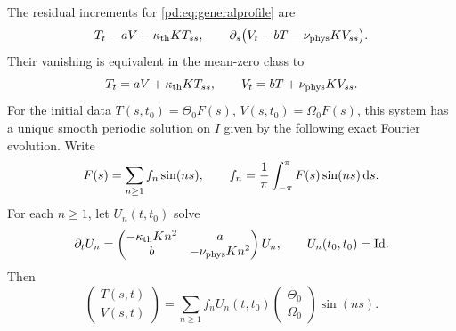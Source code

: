 \begin{pdproposition}\label{pd:prop:profile}
The residual increments for \eqref{pd:eq:generalprofile} are
\begin{equation}\label{pd:eq:profileR}
 T_t-aV-\kappa_{\rm th} K T_{ss},\qquad
 \partial_s\big(V_t-bT-\nu_{\rm phys} K V_{ss}\big).
\end{equation}
Their vanishing is equivalent in the mean-zero class to
\begin{equation}\label{pd:eq:profilePDE}
 T_t=aV+\kappa_{\rm th} K T_{ss},\qquad
 V_t=bT+\nu_{\rm phys} K V_{ss}.
\end{equation}
For the initial data $T(s,t_0)=\Theta_0F(s)$,
$V(s,t_0)=\Omega_0F(s)$, this system has a unique smooth periodic solution
on $I$ given by the following exact Fourier evolution. Write
\begin{equation}\label{pd:eq:fourier}
 F(s)=\sum_{n\geq1} f_n\sin(ns),\qquad
 f_n=\frac1\pi\int_{-\pi}^{\pi}F(s)\sin(ns)\,\mathrm d s.
\end{equation}
For each $n\geq1$, let $U_n(t,t_0)$ solve
\begin{equation}\label{pd:eq:Un}
 \partial_t U_n=
 \begin{pmatrix}-\kappa_{\rm th} K n^2&a\\b&-\nu_{\rm phys} K n^2\end{pmatrix}U_n,
 \qquad U_n(t_0,t_0)=\mathrm{Id}.
\end{equation}
Then
\begin{equation}\label{pd:eq:profileSolution}
 \begin{pmatrix}T(s,t)\\V(s,t)\end{pmatrix}
 =\sum_{n\geq1}f_n U_n(t,t_0)
       \begin{pmatrix}\Theta_0\\\Omega_0\end{pmatrix}\sin(ns).
\end{equation}
\end{pdproposition}
